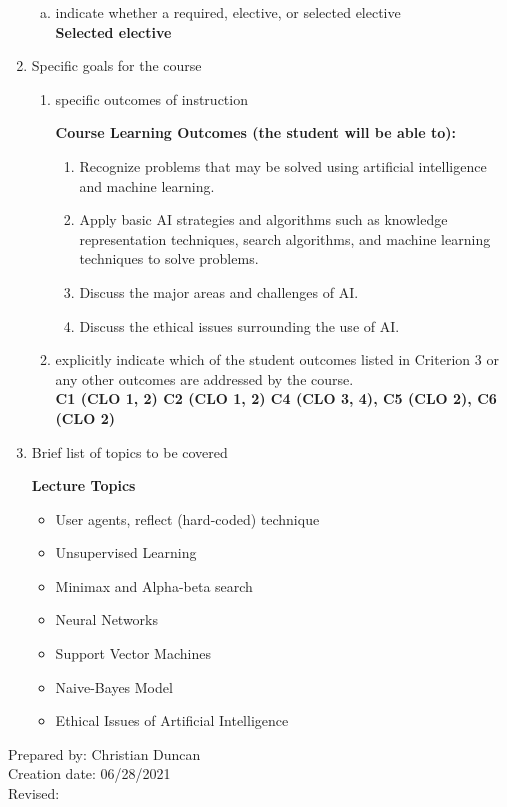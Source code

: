 \begin{enumerate}[1.]
\begin{enumerate}[a.]
\item indicate whether a required, elective, or selected elective\\ %
  {\bfseries
    Selected elective
  }

\end{enumerate}

\item Specific goals for the course
\begin{enumerate}
\item specific outcomes of instruction\\ %
  {\bfseries
    Course Learning Outcomes (the student will be able to):
\begin{enumerate}
\item Recognize problems that may be solved using artificial intelligence and machine learning.
\item Apply basic AI strategies and algorithms such as knowledge representation techniques, 
search algorithms, and machine learning techniques to solve problems.
\item Discuss the major areas and challenges of AI.
\item Discuss the ethical issues surrounding the use of AI.
\end{enumerate}
  }

\item explicitly indicate which of the student outcomes listed in Criterion 3 or any other outcomes are addressed by the course.\\
  {\bfseries
    C1 (CLO 1, 2)
    C2 (CLO 1, 2)
    C4 (CLO 3, 4),
    C5 (CLO 2),
    C6 (CLO 2)
  }
\end{enumerate}

\item Brief list of topics to be covered\\
  {\bfseries
    Lecture Topics
    \begin{itemize}
    \item User agents, reflect (hard-coded) technique
    \item Unsupervised Learning
    \item Minimax and Alpha-beta search
    \item Neural Networks
    \item Support Vector Machines
    \item Naive-Bayes Model
    \item Ethical Issues of Artificial Intelligence
    \end{itemize}
  }
\end{enumerate}

\noindent Prepared by: Christian Duncan\\
\noindent Creation date: 06/28/2021\\
\noindent Revised:\\
